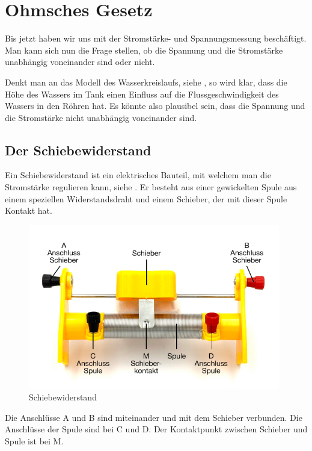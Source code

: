 

\newpage
\chapter{Ohmsches Gesetz}


Bis jetzt haben wir uns mit der Stromstärke- und Spannungsmessung beschäftigt.
Man kann sich nun die Frage stellen, ob die Spannung und die Stromstärke
unabhängig voneinander sind oder nicht.

Denkt man an das Modell des Wasserkreislaufs, siehe ,
so wird klar, dass die Höhe des Wassers im Tank einen Einfluss auf die
Flussgeschwindigkeit des Wassers in den Röhren hat.
Es könnte also plausibel sein, dass die Spannung und die Stromstärke nicht
unabhängig voneinander sind.

\section{Der Schiebewiderstand}

Ein Schiebewiderstand ist ein elektrisches Bauteil, mit welchem man die Stromstärke
regulieren kann, siehe . Er besteht aus einer gewickelten Spule
aus einem speziellen Widerstandsdraht und einem Schieber, der mit dieser Spule Kontakt hat.

\begin{figure}[h!]
    \centering
    \includegraphics[width=11cm]{_images/schiebewiderstand.pdf}
    \caption{Schiebewiderstand}
    \label{fig:potentiometer}
\end{figure}

Die Anschlüsse A und B sind miteinander und mit dem Schieber verbunden.
Die Anschlüsse der Spule sind bei C und D. Der Kontaktpunkt zwischen Schieber und Spule ist bei M.




